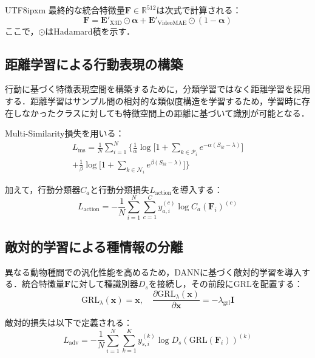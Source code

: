 \documentclass[twocolumn]{svjour3}
\begin{document}
\begin{CJK}{UTF8}{ipxm}
最終的な統合特徴量$\mathbf{F} \in \mathbb{R}^{512}$は次式で計算される：
\begin{equation}
  \mathbf{F} = \mathbf{E}'_{\mathrm{X3D}} \odot \boldsymbol{\alpha} + \mathbf{E}'_{\mathrm{VideoMAE}} \odot (1 - \boldsymbol{\alpha})
\end{equation}
ここで，$\odot$はHadamard積を示す．

\subsection{距離学習による行動表現の構築}

行動に基づく特徴表現空間を構築するために，分類学習ではなく距離学習を採用する．距離学習はサンプル間の相対的な類似度構造を学習するため，学習時に存在しなかったクラスに対しても特徴空間上の距離に基づいて識別が可能となる．

Multi-Similarity損失\cite{wang2019multi}を用いる：
\begin{multline}
  L_{\mathrm{ms}} = \frac{1}{N} \sum_{i=1}^{N} \biggl\{
    \frac{1}{\alpha} \log \biggl[ 1 + \sum_{k \in \mathcal{P}_i} e^{-\alpha (S_{ik} - \lambda)} \biggr] \\
    + \frac{1}{\beta} \log \biggl[ 1 + \sum_{k \in \mathcal{N}_i} e^{\beta (S_{ik} - \lambda)} \biggr]
  \biggr\}
\end{multline}

加えて，行動分類器$C_a$と行動分類損失$L_{\mathrm{action}}$を導入する：
\begin{equation}
  L_{\mathrm{action}} = -\frac{1}{N} \sum_{i=1}^{N} \sum_{c=1}^{C} y_{a,i}^{(c)} \log C_a(\mathbf{F}_i)^{(c)}
\end{equation}

\subsection{敵対的学習による種情報の分離}

異なる動物種間での汎化性能を高めるため，DANN\cite{ganin2016domain}に基づく敵対的学習を導入する．統合特徴量$\mathbf{F}$に対して種識別器$D_s$を接続し，その前段にGRLを配置する：
\begin{equation}
  \mathrm{GRL}_{\lambda}(\mathbf{x}) = \mathbf{x}, \quad
  \frac{\partial \mathrm{GRL}_{\lambda}(\mathbf{x})}{\partial \mathbf{x}} = -\lambda_{\mathrm{grl}} \mathbf{I}
\end{equation}

敵対的損失は以下で定義される：
\begin{equation}
  L_{\mathrm{adv}} = -\frac{1}{N} \sum_{i=1}^{N} \sum_{k=1}^{K} y_{s,i}^{(k)} \log D_s(\mathrm{GRL}(\mathbf{F}_i))^{(k)}
\end{equation}


\end{CJK}
\end{document}
